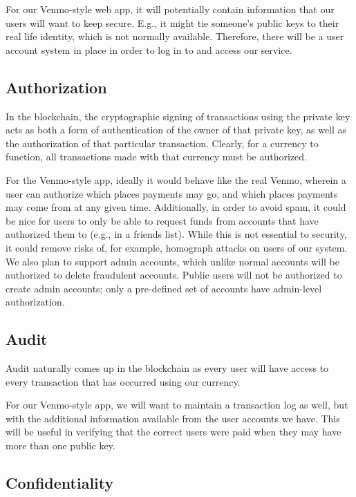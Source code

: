 \documentclass[12pt]{article}
\begin{document}
For our Venmo-style web app, it will potentially contain information that our users will want to keep secure.
E.g., it might tie someone's public keys to their real life identity, which is not normally available.
Therefore, there will be a user account system in place in order to log in to and access our service.


\subsection{Authorization}

In the blockchain, the cryptographic signing of transactions using the private key acts as both a form of authentication of the owner of that private key, as well as the authorization of that particular transaction.
Clearly, for a currency to function, all transactions made with that currency must be authorized.

For the Venmo-style app, ideally it would behave like the real Venmo, wherein a user can authorize which places payments may go, and which places payments may come from at any given time.
Additionally, in order to avoid spam, it could be nice for users to only be able to request funds from accounts that have authorized them to (e.g., in a friends list).
While this is not essential to security, it could remove risks of, for example, homograph attacks on users of our system.
We also plan to support admin accounts, which unlike normal accounts will be authorized to delete fraudulent accounts.
Public users will not be authorized to create admin accounts; only a pre-defined set of accounts have admin-level authorization.


\subsection{Audit}

Audit naturally comes up in the blockchain as every user will have access to every transaction that has occurred using our currency.

For our Venmo-style app, we will want to maintain a transaction log as well, but with the additional information available from the user accounts we have.
This will be useful in verifying that the correct users were paid when they may have more than one public key.

\subsection{Confidentiality}
\end{document}
